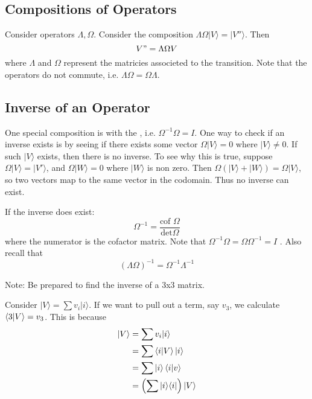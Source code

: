 \documentclass[11pt]{scrartcl}
\begin{document}
\subsection{Compositions of Operators}

Consider operators $ \Lambda, \Omega $. Consider the composition $ \Lambda \Omega |V \rangle  = |V'' \rangle  $. Then
\begin{equation}
	V" = \Lambda \Omega V
\end{equation}
where $ \Lambda $ and $ \Omega $ represent the matricies associeted to the transition. Note that the operators do not commute, i.e. $ \Lambda \Omega = \Omega \Lambda $.

\subsection{Inverse of an Operator}

One special composition is with the  , i.e. $ \Omega ^{-1} \Omega = I $. One way to check if an inverse exists is by seeing if there exists some vector $ \Omega |V \rangle = 0 $ where $ |V \rangle \neq 0 $. If such $ |V \rangle   $ exists, then there is no inverse. To see why this is true, suppose $ \Omega |V \rangle  = |V' \rangle  $, and $ \Omega |W \rangle  = 0 $ where $ |W \rangle  $ is non zero. Then $ \Omega(| V\rangle + |W \rangle ) = \Omega |V \rangle  $, so two vectors map to the same vector in the codomain. Thus no inverse can exist. 

If the inverse does exist:
\begin{equation}
	\Omega ^{-1} = \frac{ \text{cof } \Omega }{ \text{det} \Omega } 
\end{equation}
where the numerator is the cofactor matrix. Note that $ \Omega ^{-1} \Omega = \Omega \Omega ^{-1} = I $ . Also recall that 
\begin{equation}
	(\Lambda \Omega) ^{-1} = \Omega ^{-1} \Lambda ^{-1} 
\end{equation}

Note: Be prepared to find the inverse of a 3x3 matrix.

Consider $ |V \rangle  = \sum v_i |i \rangle  $. If we want to pull out a term, say $ v_3 $, we calculate $ \braket{3|V}  = v_3 $. This is because
\begin{align}
	|V \rangle &= \sum v_i |i \rangle \\ &= \sum \braket{i|V} |i \rangle \\
		   &= \sum |i  \rangle \braket{i|v} \\
		   &= \left(\sum |i \rangle \langle i | \right) |V \rangle 
\end{align}
\end{document}
